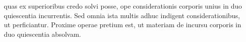 %
quas ex superioribus credo solvi posse, ope considerationis corporis unius  
%
in duo quiescentia incurrentis.\protect{}
%
Sed omnia ista multis adhuc indigent considerationibus, ut perficiantur. 
%
Proxime operae  pretium est, ut materiam de incursu corporis in duo quiescentia%
\protect{} absolvam.
%
\pend
\count{}%
\count{}%
\count{}